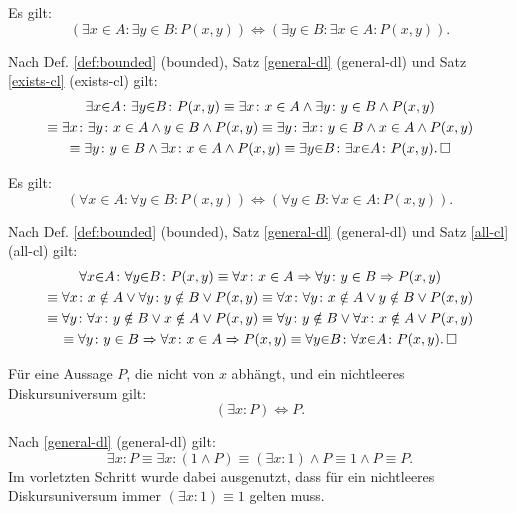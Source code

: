 \begin{Satz}\label{bounded-exists-cl}
Es gilt:
\[(\exists x{\in}A\colon \exists y{\in}B\colon P(x,y))
\iff (\exists y{\in}B\colon \exists x{\in}A\colon P(x,y)).\]
\end{Satz}

\begin{Beweis} Nach Def. \ref{def:bounded} (bounded),
Satz \ref{general-dl} (general-dl)
und Satz \ref{exists-cl} (exists-cl) gilt:
\begin{gather*}
\exists x{\in}A\colon \exists y{\in}B\colon P(x,y)
\equiv \exists x\colon x\in A\land\exists y\colon y\in B\land P(x,y)\\
\equiv \exists x\colon \exists y\colon x\in A\land y\in B\land P(x,y)
\equiv \exists y\colon \exists x\colon y\in B\land x\in A\land P(x,y)\\
\equiv \exists y\colon y\in B\land \exists x\colon x\in A\land P(x,y)
\equiv \exists y{\in}B\colon\exists x{\in}A\colon P(x,y).\,\square
\end{gather*}
\end{Beweis}

\begin{Satz}\label{bounded-all-cl}
Es gilt:
\[(\forall x{\in}A\colon \forall y{\in}B\colon P(x,y))
\iff (\forall y{\in}B\colon \forall x{\in}A\colon P(x,y)).\]
\end{Satz}
\begin{Beweis}\newlinefirst
Nach Def. \ref{def:bounded} (bounded),
Satz \ref{general-dl} (general-dl)
und Satz \ref{all-cl} (all-cl) gilt:
\begin{gather*}
\forall x{\in}A\colon \forall y{\in}B\colon P(x,y)
\equiv \forall x\colon x\in A\Rightarrow \forall y\colon y\in B\Rightarrow P(x,y)\\
\equiv \forall x\colon x\notin A\lor \forall y\colon y\notin B\lor P(x,y)
\equiv \forall x\colon \forall y\colon x\notin A\lor y\notin B\lor P(x,y)\\
\equiv \forall y\colon \forall x\colon y\notin B\lor x\notin A\lor P(x,y)
\equiv \forall y\colon y\notin B\lor \forall x\colon x\notin A\lor P(x,y)\\
\equiv \forall y\colon y\in B\Rightarrow \forall x\colon x\in A\Rightarrow P(x,y)
\equiv \forall y{\in}B\colon\forall x{\in}A\colon P(x,y).\,\square
\end{gather*}
\end{Beweis}

\begin{Satz}
Für eine Aussage $P$, die nicht von $x$ abhängt, und ein nichtleeres
Diskursuniversum gilt:
\[(\exists x\colon P) \iff P.\]
\end{Satz}
\begin{Beweis}[Beweis]
Nach \ref{general-dl} (general-dl) gilt:
\[\exists x\colon P \equiv \exists x\colon (1\land P)
\equiv (\exists x\colon 1)\land P\equiv 1\land P\equiv P.\]
Im vorletzten Schritt wurde dabei ausgenutzt, dass
für ein nichtleeres Diskursuniversum immer $(\exists x\colon 1)\equiv 1$
gelten muss.\,\qedsymbol
\end{Beweis}

